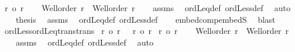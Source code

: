 \begin{isabellebody}
\ {\isachardoublequoteopen}r\ {\isacharless}{\kern0pt}o\ r{\isacharprime}{\kern0pt}{\isacharprime}{\kern0pt}{\isachardoublequoteclose}\isanewline
%
\isadelimproof
%
\endisadelimproof
%
\isatagproof
{}\isamarkupfalse%
{\isacharminus}{\kern0pt}\isanewline
\ \ \isamarkupfalse%
\ {\isachardoublequoteopen}Well{\isacharunderscore}{\kern0pt}order\ r\ {\isasymand}\ Well{\isacharunderscore}{\kern0pt}order\ r{\isacharprime}{\kern0pt}{\isacharprime}{\kern0pt}{\isachardoublequoteclose}\isanewline
\ \ \isamarkupfalse%
\ assms\ \isamarkupfalse%
\ ordLeq{\isacharunderscore}{\kern0pt}def\ ordLess{\isacharunderscore}{\kern0pt}def\ \isamarkupfalse%
\ auto\isanewline
\ \ \isamarkupfalse%
\ {\isacharquery}{\kern0pt}thesis\ \isamarkupfalse%
\ assms\ \isamarkupfalse%
\ ordLeq{\isacharunderscore}{\kern0pt}def\ ordLess{\isacharunderscore}{\kern0pt}def\isanewline
\ \ \isamarkupfalse%
\ embed{\isacharunderscore}{\kern0pt}comp{\isacharunderscore}{\kern0pt}embedS\ \isamarkupfalse%
\ blast\isanewline
{}\isamarkupfalse%
%
\endisatagproof
{\isafoldproof}%
%
\isadelimproof
\isanewline
%
\endisadelimproof
\isanewline
{}\isamarkupfalse%
\ ordLess{\isacharunderscore}{\kern0pt}ordLeq{\isacharunderscore}{\kern0pt}trans{\isacharbrackleft}{\kern0pt}trans{\isacharbrackright}{\kern0pt}{\isacharcolon}{\kern0pt}\isanewline
{}\ {\isachardoublequoteopen}r\ {\isacharless}{\kern0pt}o\ r{\isacharprime}{\kern0pt}{\isachardoublequoteclose}\ \ {\isachardoublequoteopen}\ r{\isacharprime}{\kern0pt}\ {\isasymle}o\ r{\isacharprime}{\kern0pt}{\isacharprime}{\kern0pt}{\isachardoublequoteclose}\isanewline
{}\ {\isachardoublequoteopen}r\ {\isacharless}{\kern0pt}o\ r{\isacharprime}{\kern0pt}{\isacharprime}{\kern0pt}{\isachardoublequoteclose}\isanewline
%
\isadelimproof
%
\endisadelimproof
%
\isatagproof
{}\isamarkupfalse%
{\isacharminus}{\kern0pt}\isanewline
\ \ \isamarkupfalse%
\ {\isachardoublequoteopen}Well{\isacharunderscore}{\kern0pt}order\ r\ {\isasymand}\ Well{\isacharunderscore}{\kern0pt}order\ r{\isacharprime}{\kern0pt}{\isacharprime}{\kern0pt}{\isachardoublequoteclose}\isanewline
\ \ \isamarkupfalse%
\ assms\ \isamarkupfalse%
\ ordLeq{\isacharunderscore}{\kern0pt}def\ ordLess{\isacharunderscore}{\kern0pt}def\ \isamarkupfalse%
\ auto\isanewline
\ \ \isamarkupfalse%

\end{isabellebody}

